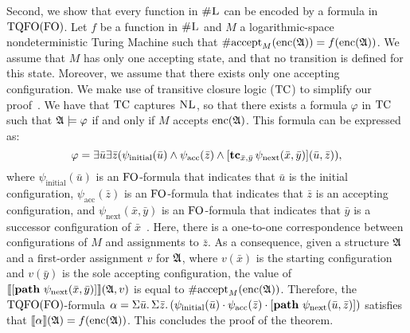 Second, we show that every function in $\text{\sc \#L}$ can be encoded by a formula in ${\rm TQFO}({\rm FO})$.
Let $f$ be a function in $\text{\sc \#L}$ and $M$ a logarithmic-space nondeterministic  Turing Machine such that $\text{\rm \#accept}_M({\rm enc}(\mathfrak{A})) = f({\rm enc}(\mathfrak{A}))$. We assume that $M$ has only one accepting state, and that no transition is defined for this state. Moreover, we assume that there exists only one accepting configuration. We make use of transitive closure logic (${\rm TC}$) to simplify our proof~\cite{G07}. We have that ${\rm TC}$ captures $\text{\sc NL}$\cite{I83}, so that there exists a formula $\varphi$ in ${\rm TC}$ such that $\mathfrak{A}\models\varphi$ if and only if $M$ accepts ${\rm enc}(\mathfrak{A})$. This formula can be expressed as:
$$
\varphi = \exists\bar{u}\exists\bar{z}(\psi_{\text{initial}}(\bar{u})\wedge \psi_{\text{acc}}(\bar{z})\wedge[{\bf tc}_{\bar{x},\bar{y}}\,\psi_{\text{next}}(\bar{x},\bar{y})](\bar{u},\bar{z})),
$$
where $\psi_{\text{initial}}(\bar{u})$ is an ${\rm FO}$-formula that indicates that $\bar{u}$ is the initial configuration, $\psi_{\text{acc}}(\bar{z})$ is an ${\rm FO}$-formula that indicates that $\bar{z}$ is an accepting configuration, and $\psi_{\text{next}}(\bar{x},\bar{y})$ is an ${\rm FO}$-formula that indicates that $\bar{y}$ is a successor configuration of $\bar{x}$~\cite{G07}. Here, there is a one-to-one correspondence between configurations of $M$ and assignments to $\bar{z}$. As a consequence, given a structure $\mathfrak{A}$ and a first-order assignment $v$ for $\mathfrak{A}$, where $v(\bar{x})$ is the starting configuration and $v(\bar{y})$ is the sole accepting configuration, the value of ${\llbracket{}{[{\bf path} \,\, \psi_{\text{next}}(\bar{x},\bar{y})]}\rrbracket}(\mathfrak{A},v)$ is equal to $\text{\rm \#accept}_M({\rm enc}(\mathfrak{A}))$.
Therefore, the ${\rm TQFO}({\rm FO})$-formula
$
\alpha = \Sigma{\bar{u}}.\,\Sigma{\bar{z}}.\,(\psi_{\text{initial}}(\bar{u})\cdot\psi_{\text{acc}}(\bar{z})\cdot[{\bf path} \,\, \psi_{\text{next}}(\bar{u},\bar{z})])
$
satisfies that ${\llbracket{}{\alpha}\rrbracket}(\mathfrak{A}) = f({\rm enc}(\mathfrak{A}))$. This concludes the proof of the theorem.